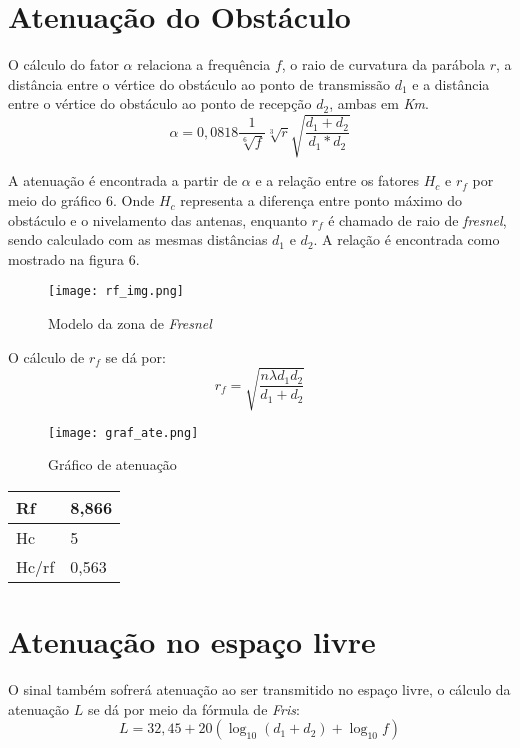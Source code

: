 \section{Atenuação do Obstáculo}
O cálculo do fator $\alpha$ relaciona a frequência $f$, o raio de curvatura da parábola $r$, a distância entre o vértice do obstáculo ao ponto de transmissão $d_1$ e a distância entre o vértice do obstáculo ao ponto de recepção $d_2$, ambas em \textit{Km}.
\begin{equation}
\alpha = 0,0818\dfrac{1}{\sqrt[6]{f}}\sqrt[3]{r}\sqrt{\dfrac{d_1+d_2}{d_1*d_2}}
\end{equation}

A atenuação é encontrada a partir de $\alpha$ e a relação entre os fatores  $H_c$ e $r_f$ por meio do gráfico 6. Onde $H_c$ representa a diferença entre ponto máximo do obstáculo e o nivelamento das antenas, enquanto $r_f$  é chamado de raio de \textit{fresnel}, sendo calculado com as mesmas distâncias $d_1$ e $d_2$. A relação é encontrada como mostrado na figura 6.

\begin{figure}[h]
	\centering
	\texttt{[image: rf\_img.png]}
	\label{fig:rf_img}
	\caption{Modelo da zona de \textit{Fresnel}}
\end{figure}

O cálculo de $r_f$ se dá por:
\begin{equation}
r_f = \sqrt{\dfrac{n\lambda d_1 d_2}{d_1 + d_2}}
\end{equation}

\begin{figure}[h]
	\centering
	\texttt{[image: graf\_ate.png]}
	\label{fig:graf_ate}
	\caption{Gráfico de atenuação}
\end{figure} 


\begin{center}
	\begin{table}[]
		\begin{tabular}{|l|l|}
			\hline
			Rf    & 8,866 \\ \hline
			Hc    & 5     \\ \hline
			Hc/rf & 0,563 \\ \hline
		\end{tabular}
	\end{table}
\end{center}


\section{Atenuação no espaço livre}
O sinal também sofrerá atenuação ao ser transmitido no espaço livre, o cálculo da atenuação $L$ se dá por meio da fórmula de \textit{Fris}:
\begin{equation}
L = 32,45 +20(\log_{10}(d_1+d_2) + \log_{10}f)
\end{equation}



